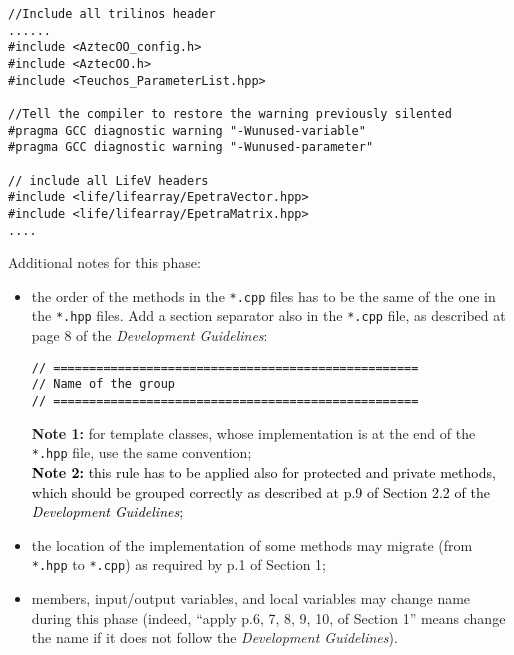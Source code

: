 \documentclass[10p]{article}
\newcommand{\newparts}[1]{\textcolor{black}{#1}}
\theoremstyle{definition}
\begin{document}
\begin{enumerate}
\begin{lstlisting}
//Include all trilinos header
......
#include <AztecOO_config.h>
#include <AztecOO.h>
#include <Teuchos_ParameterList.hpp>

//Tell the compiler to restore the warning previously silented
#pragma GCC diagnostic warning "-Wunused-variable"
#pragma GCC diagnostic warning "-Wunused-parameter"

// include all LifeV headers
#include <life/lifearray/EpetraVector.hpp>
#include <life/lifearray/EpetraMatrix.hpp>
....
  \end{lstlisting}

\end{enumerate}

\vspace{2ex}
\noindent Additional notes for this phase:
\begin{itemize}
  \item the order of the methods in the \texttt{*.cpp} files has to be the same of the one in the \texttt{*.hpp} files. Add a section separator also in the \texttt{*.cpp} file, as described at page 8 of the \emph{Development Guidelines}:
\begin{lstlisting}
// ===================================================
// Name of the group
// ===================================================
\end{lstlisting}
\textbf{Note 1:} for template classes, whose implementation is at the end of the \texttt{*.hpp} file, use the same convention;\\
\newparts{\textbf{Note 2:} this rule has to be applied also for protected and private methods, which should be grouped correctly as described at p.9 of Section 2.2 of the \emph{Development Guidelines};}
  \item the location of the implementation of some methods may migrate (from \texttt{*.hpp} to \texttt{*.cpp}) as required by p.1 of Section 1;
  \item members, input/output variables, and local variables may change name during this phase (indeed, ``apply p.6, 7, 8, 9, 10, of Section 1'' means change the name if it does not follow the \emph{Development Guidelines}).
\end{itemize}
\end{document}
